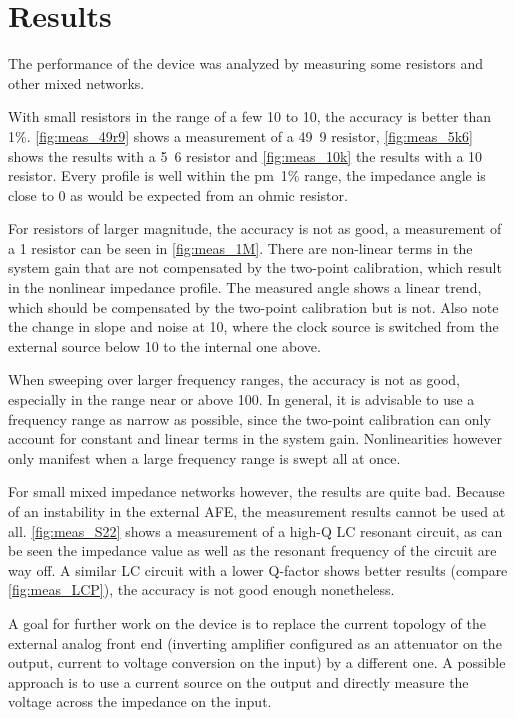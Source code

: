 \chapter{Results} \label{sec:results}

The performance of the device was analyzed by measuring some resistors and other mixed networks.

With small resistors in the range of a few \unit{10}{\ohm} to \unit{10}{\kilo\ohm}, the accuracy is better than
\unit{1}{\%}.
\autoref{fig:meas_49r9} shows a measurement of a \unit{49.9}{\ohm} resistor,
\autoref{fig:meas_5k6} shows the results with a \unit{5.6}{\kilo\ohm} resistor
and \autoref{fig:meas_10k} the results with a \unit{10}{\kilo\ohm} resistor.
Every profile is well within the \unit{\pm 1}{\%} range, the impedance angle is close to 0 as would be expected from
an ohmic resistor.

For resistors of larger magnitude, the accuracy is not as good, a measurement of a \unit{1}{\mega\ohm} resistor can be
seen in \autoref{fig:meas_1M}. There are non-linear terms in the system gain that are not compensated by the two-point
calibration, which result in the nonlinear impedance profile. The measured angle shows a linear trend, which should
be compensated by the two-point calibration but is not.
Also note the change in slope and noise at \unit{10}{\kilo\hertz}, where the clock source is switched from the external
source below \unit{10}{\kilo\hertz} to the internal one above.

When sweeping over larger frequency ranges, the accuracy is not as good, especially in the range near or above
\unit{100}{\kilo\hertz}.
In general, it is advisable to use a frequency range as narrow as possible, since the two-point calibration can only
account for constant and linear terms in the system gain. Nonlinearities however only manifest when a large frequency
range is swept all at once.

For small mixed impedance networks however, the results are quite bad. Because of  an instability in the external AFE,
the measurement results cannot be used at all. \autoref{fig:meas_S22} shows a measurement of a high-Q LC resonant
circuit, as can be seen the impedance value as well as the resonant frequency of the circuit are way off.
A similar LC circuit with a lower Q-factor shows better results (compare \autoref{fig:meas_LCP}), the accuracy is not
good enough nonetheless.

A goal for further work on the device is to replace the current topology of the external analog front end
(inverting amplifier configured as an attenuator on the output, current to voltage conversion on the input)
by a different one. A possible approach is to use a current source on the output and directly measure the voltage
across the impedance on the input.

